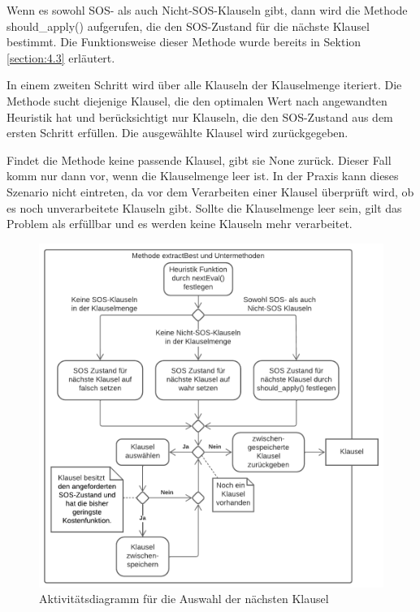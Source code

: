 Wenn es sowohl SOS- als auch Nicht-SOS-Klauseln gibt, dann wird die Methode should\_apply() aufgerufen, die den SOS-Zustand für die nächste Klausel bestimmt. Die Funktionsweise dieser Methode wurde bereits in Sektion \ref{section:4.3} erläutert.

In einem zweiten Schritt wird über alle Klauseln der Klauselmenge iteriert. Die Methode sucht diejenige Klausel, die den optimalen Wert nach angewandten Heuristik hat und berücksichtigt nur Klauseln, die den SOS-Zustand aus dem ersten Schritt erfüllen. Die ausgewählte Klausel wird zurückgegeben.

Findet die Methode keine passende Klausel, gibt sie None zurück. Dieser Fall komm nur dann vor, wenn die Klauselmenge leer ist. In der Praxis kann dieses Szenario nicht eintreten, da vor dem Verarbeiten einer Klausel überprüft wird, ob es noch unverarbeitete Klauseln gibt. Sollte die Klauselmenge leer sein, gilt das Problem als erfüllbar und es werden keine Klauseln mehr verarbeitet.

\begin{figure}
	\centering
	\includegraphics[width=0.9\linewidth]{images/Lucid/SelectNext}
	\caption{Aktivitätsdiagramm für die Auswahl der nächsten Klausel}
	\label{fig:selectnext}
\end{figure}

